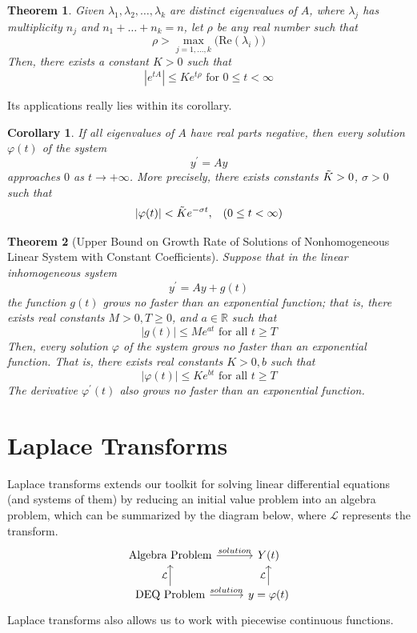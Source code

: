 \documentclass{article}
\newtheorem{theorem}{Theorem}[section]
\newtheorem{corollary}{Corollary}[theorem]
\theoremstyle{remark}
\theoremstyle{definition}
\begin{document}
\begin{theorem}
Given $\lambda_1, \lambda_2, \ldots, \lambda_k$ are distinct eigenvalues of $A$, where $\lambda_j$ has multiplicity $n_j$ and $n_1 + \ldots + n_k = n$, let $\rho$ be any real number such that 
\[\rho > \max_{j=1, \ldots, k} \big( \text{Re}(\lambda_i)\big)\]
Then, there exists a constant $K > 0$ such that
\[|e^{tA}| \leq K e^{t \rho} \text{ for } 0 \leq t < \infty\]
\end{theorem}

Its applications really lies within its corollary. 

\begin{corollary}
If all eigenvalues of $A$ have real parts negative, then every solution $\varphi(t)$ of the system
\[y^\prime = A y\]
approaches $0$ as $t \rightarrow + \infty$. More precisely, there exists constants $\Tilde{K} > 0$, $\sigma > 0$ such that
\[|\varphi(t)|< \Tilde{K} e^{-\sigma t}, \;\;\; (0 \leq t < \infty)\]
\end{corollary}

\begin{theorem}[Upper Bound on Growth Rate of Solutions of Nonhomogeneous Linear System with Constant Coefficients]
Suppose that in the linear inhomogeneous system 
\[y^\prime = A y + g(t)\]
the function $g(t)$ grows no faster than an exponential function; that is, there exists real constants $M > 0, T \geq 0$, and $a \in \mathbb{R}$ such that
\[|g(t)| \leq M e^{at} \text{ for all } t \geq T\]
Then, every solution $\varphi$ of the system grows no faster than an exponential function. That is, there exists real constants $K>0, b$ such that
\[|\varphi(t)| \leq K e^{bt} \text{ for all } t \geq T\]
The derivative $\varphi^\prime (t)$ also grows no faster than an exponential function. 
\end{theorem}

\section{Laplace Transforms}
Laplace transforms extends our toolkit for solving linear differential equations (and systems of them) by reducing an initial value problem into an algebra problem, which can be summarized by the diagram below, where $\mathcal{L}$ represents the transform. 
\[
  \begin{tikzcd}
    \text{Algebra Problem} \arrow{r}{solution} &  Y(t)\\
    \text{DEQ Problem} \arrow{u}{\mathcal{L}} \arrow{r}{solution} & y = \varphi(t) \arrow{u}{\mathcal{L}}
  \end{tikzcd}
\]
Laplace transforms also allows us to work with piecewise continuous functions. 
\end{document}
